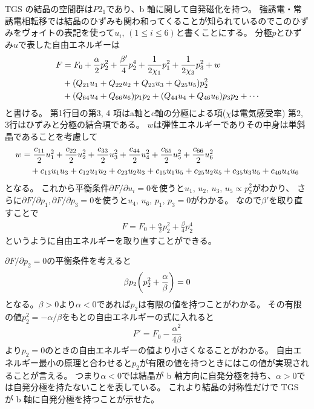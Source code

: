 \documentclass[11pt,dvipdfmx,a4paper]{jsarticle}
\begin{document}
TGS の結晶の空間群は\(P2_1\)であり、b 軸に関して自発磁化を持つ。
強誘電・常誘電相転移では結晶のひずみも関わ和ってくることが知られているのでこのひずみをヴォイトの表記を使って\(u_i,\,(1\leq i \leq6)\)と書くことにする。
分極\(p\)とひずみ\(u\)で表した自由エネルギーは
\begin{align}
    F
    &= F_0 + \frac{\alpha}{2}p_2^2 + \frac{\beta'}{4}p_2^4+\frac{1}{2\chi_1}p_1^2+\frac{1}{2\chi_3}p_3^2 + w \notag\\
    &+(Q_{21}u_1+Q_{22}u_2+Q_{23}u_3 + Q_{25}u_5)p_2^2 \notag\\
    &+(Q_{64}u_4+Q_{66}u_6)p_1 p_2 +(Q_{44}u_4+Q_{46}u_6)p_3 p_2+\cdots
\end{align}
と書ける\cite{ishibashi}。
第1行目の第3, 4 項はa軸とc軸の分極による項(\(\chi\)は電気感受率)
第2, 3行はひずみと分極の結合項である。
\(w\)は弾性エネルギーでありその中身は単斜晶であることを考慮して
\begin{align}
    w
    &= \frac{c_{11}}{2}u_1^2 + \frac{c_{22}}{2}u_2^2 + \frac{c_{33}}{2}u_3^2 + \frac{c_{44}}{2}u_4^2 + \frac{c_{55}}{2}u_5^2 + \frac{c_{66}}{2}u_6^2 \notag\\
    &\quad + c_{13}u_1u_3 + c_{12}u_1u_2 + c_{23}u_2u_3 +c_{15}u_1u_5 +c_{25}u_2u_5 +c_{35}u_3u_5 +c_{46}u_4u_6
\end{align}
となる。
これから平衡条件\(\partial F/ \partial u_i = 0\)を使うと\(u_1,\,u_2,\,u_3,\,u_5 \propto p_2^2\)がわかり、
さらに\(\partial F/ \partial p_1, \partial F/ \partial p_3 = 0\)を使うと\(u_4,\,u_6,\,p_1,\,p_3 = 0\)がわかる。
なので\(\beta'\)を取り直すことで
\begin{align}
    F = F_0 + \frac{\alpha}{2}p_2^2 + \frac{\beta}{4}p_2^4
\end{align}
というように自由エネルギーを取り直すことができる。

\(\partial F/ \partial p_2 = 0\)の平衡条件を考えると
\begin{align}
    \beta p_2 \qty(p_2^2+\frac{\alpha}{\beta})=0
\end{align}
となる。\(\beta > 0\)より\(\alpha<0\)であれば\(p_2\)は有限の値を持つことがわかる。
その有限の値\(p_2^2 = -\alpha/\beta\)をもとの自由エネルギーの式に入れると
\begin{equation}
    F' = F_0 -\frac{\alpha^2}{4\beta}
\end{equation}
より\(p_2=0\)のときの自由エネルギーの値より小さくなることがわかる。
自由エネルギー最小の原理と合わせると\(p_2\)が有限の値を持つときにはこの値が実現されることが言える。
つまり\(\alpha<0\)では結晶が b 軸方向に自発分極を持ち、\(\alpha>0\)では自発分極を持たないことを表している。
これより結晶の対称性だけで TGS が b 軸に自発分極を持つことが示せた。
\end{document}
